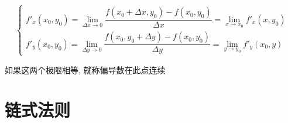 \begin{definition}[偏导数连续性]
	
	$$\begin{cases}
	f'_{x}(x_{0},y_{0}) = \lim\limits_{\Delta x\to 0}\dfrac{f(x_{0}+\Delta x,y_{0})-f(x_{0},y_{0})}{\Delta x} = \lim\limits_{x\to x_{0}} f'_{x}(x,y_{0})\\
	f'_{y}(x_{0},y_{0}) = \lim\limits_{\Delta y\to 0}\dfrac{f(x_{0},y_{0}+\Delta y)-f(x_{0},y_{0})}{\Delta y} = \lim\limits_{y\to y_{0}} f'_{y}(x_{0},y)
	\end{cases}$$
	
	如果这两个极限相等, 就称偏导数在此点连续
\end{definition}
\section{链式法则}

